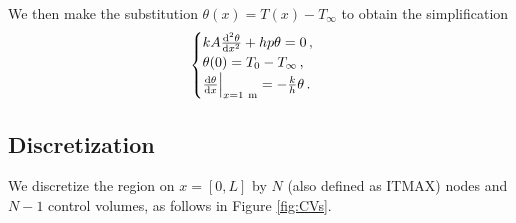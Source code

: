 \documentclass{article}
\begin{document}
We then make the substitution $\theta(x) = T(x) - T_\infty$ to obtain the simplification
\begin{equation}
	\begin{cases}
		kA \dv{^2\theta}{x^2} + h p \theta = 0\,,\\
		\theta(0) = T_0 - T_\infty\,,\\
		\dv{\theta}{x} \Big|_{x = 1~\text{m}} = - \frac{k}{h} \theta\,.
	\end{cases}
	\end{equation}
	
\subsection*{Discretization}

We discretize the region on $x = [0, L]$ by $N$ (also defined as ITMAX) nodes and $N - 1$ control volumes, as follows in Figure \ref{fig:CVs}.
\end{document}
